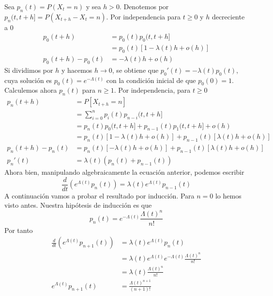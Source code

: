 \documentclass[PREyA.tex]{subfiles}
\begin{document}
\begin{dem}
		Sea $p_{n}(t) = P(X_{t} = n ) $ y sea $h>0$. Denotemos por $p_{n} (t,t+h] =P(X_{t+h}-X_{t}=n)$. Por independencia para $ t \geq 0$ y $h$ decreciente a 0
\begin{align*}
p_{0}(t+h)&= p_{0}(t) p_{0}(t,t+h]\\
& = p_{0}(t)[1- \lambda(t)h +o(h)]\\
p_0(t+h)-p_0(t) &= -\lambda(t)h + o(h)
\end{align*}
Si dividimos por $h$ y hacemos $h\to 0$, se obtiene que $p_{0}'(t) = -\lambda(t)p_{0}(t)$, cuya solución es $p_{0}(t)=e^{-\Lambda(t)}$ con la condición inicial de que $p_0(0)=1$. Calculemos ahora $p_{n}(t)$ para $n \geq 1$. Por independencia, para $t \geq 0$
\begin{align*}
p_n(t+h)&=P[X_{t+h}=n]\\
&=\sum_{i=0}^n p_i(t)p_{n-i}(t,t+h]\\
&= p_n(t)p_0(t,t+h] + p_{n-1}(t)p_1(t,t+h]+o(h)\\
&= p_{n}(t) [1- \lambda(t)h +o(h)] + p_{n-1}(t)[\lambda(t)h+o(h)] \\
p_n(t+h) - p_n(t) &= p_n(t)[-\lambda(t)h+o(h)]+p_{n-1}(t)[\lambda(t)h+o(h)]\\
p_n'(t)&=\lambda(t)(p_n(t)+p_{n-1}(t))
\end{align*}
Ahora bien, manipulando algebraicamente la ecuación anterior, podemos escribir
$$
\frac{d}{dt}\left(e^{\Lambda(t)}p_n(t)\right) = \lambda(t)e^{\Lambda(t)}p_{n-1}(t)
$$
A continuación vamos a probar el resultado por inducción. Para $n=0$ lo hemos visto antes. Nuestra hipótesis de inducción es que
$$
p_n(t)=e^{-\Lambda(t)}\frac{\Lambda(t)^n}{n!}
$$
Por tanto
\begin{align*}
\frac{d}{dt}\left(e^{\Lambda(t)}p_{n+1}(t)\right) &= \lambda(t)e^{\Lambda(t)}p_{n}(t)\\
&= \lambda(t)e^{\Lambda(t)}e^{-\Lambda(t)}\frac{\Lambda(t)^n}{n!}\\
&=\lambda(t)\frac{\Lambda(t)^n}{n!}\\
e^{\Lambda(t)}p_{n+1}(t) &= \frac{\Lambda(t)^{n+1}}{(n+1)!}
\end{align*}
\end{dem}
\end{document}
